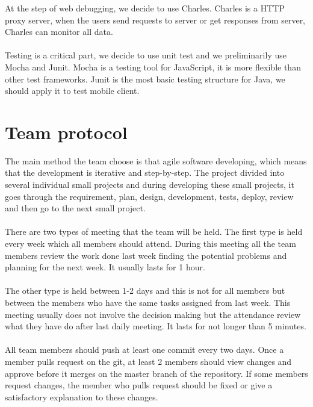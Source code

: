 \documentclass[a4paper]{article}
\begin{document}
{At the step of web debugging, we decide to use Charles. Charles is a HTTP proxy server, when the users send requests to server or get responses from server, Charles can monitor all data.\\\\
Testing is a critical part, we decide to use unit test and we preliminarily use Mocha and Junit. Mocha is a testing tool for JavaScript, it is more flexible than other test frameworks. Junit is the most basic testing structure for Java, we should apply it to test mobile client.



\section{Team protocol}
The main method the team choose is that agile software developing, which means that the development is iterative and step-by-step. The project divided into several individual small projects and during developing these small projects, it goes through the requirement, plan, design, development, tests, deploy, review and then go to the next small project.\\\\
There are two types of meeting that the team will be held. The first type is held every week which all members should attend. During this meeting all the team members review the work done last week finding the potential problems and planning for the next week. It usually lasts for 1 hour.\\\\
The other type is held between 1-2 days and this is not for all members but between the members who have the same tasks assigned from last week. This meeting usually does not involve the decision making but the attendance review what they have do after last daily meeting. It lasts for not longer than 5 minutes.\\\\
All team members should push at least one commit every two days. Once a member pulls request on the git, at least 2 members should view changes and approve before it merges on the master branch of the repository. If some members request changes, the member who pulls request should be fixed or give a satisfactory explanation to these changes.



}
\end{document}
